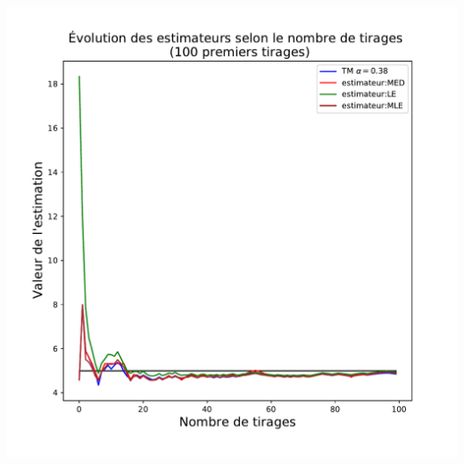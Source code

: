\documentclass[8pt,sans,aspectratio=169]{beamer}
\begin{document}
\begin{frame}
\begin{columns}[T]
\begin{column}{0.5\linewidth}
\includegraphics[scale=0.3]{Est-100.pdf}

\end{column}

\end{columns}

\vfill


\end{frame}
\end{document}
